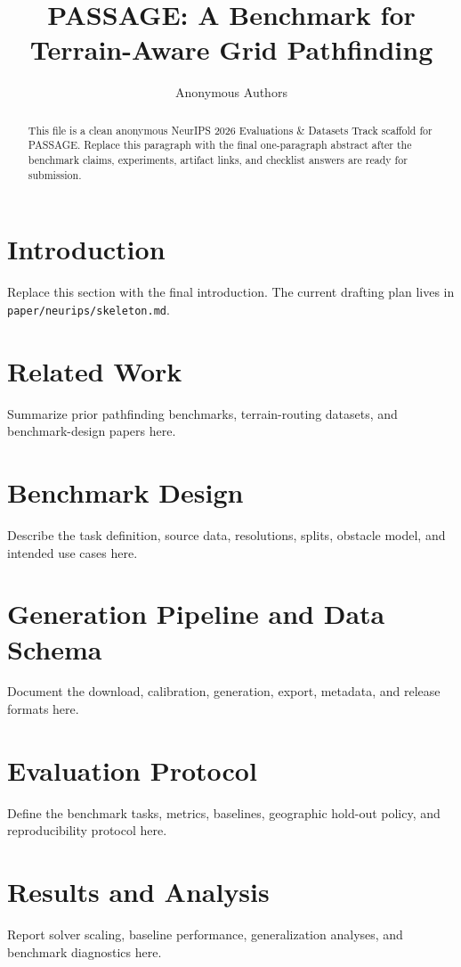 \documentclass{article}
\title{PASSAGE: A Benchmark for Terrain-Aware Grid Pathfinding}
\author{Anonymous Authors}
\begin{document}
\maketitle

\begin{abstract}
This file is a clean anonymous NeurIPS 2026 Evaluations \& Datasets Track scaffold for PASSAGE. Replace this paragraph with the final one-paragraph abstract after the benchmark claims, experiments, artifact links, and checklist answers are ready for submission.
\end{abstract}

\section{Introduction}
Replace this section with the final introduction. The current drafting plan lives in \texttt{paper/neurips/skeleton.md}.

\section{Related Work}
Summarize prior pathfinding benchmarks, terrain-routing datasets, and benchmark-design papers here.

\section{Benchmark Design}
Describe the task definition, source data, resolutions, splits, obstacle model, and intended use cases here.

\section{Generation Pipeline and Data Schema}
Document the download, calibration, generation, export, metadata, and release formats here.

\section{Evaluation Protocol}
Define the benchmark tasks, metrics, baselines, geographic hold-out policy, and reproducibility protocol here.

\section{Results and Analysis}
Report solver scaling, baseline performance, generalization analyses, and benchmark diagnostics here.
\end{document}
